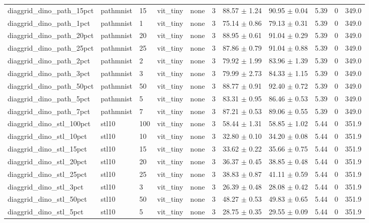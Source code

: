 \begin{tabular}{lllllllllll}
diaggrid_dino_path_15pct & pathmnist & 15 & vit_tiny & none & 3 & 88.57 $\pm$ 1.24 & 90.95 $\pm$ 0.04 & 5.39 & 0 & 349.0 \\
diaggrid_dino_path_1pct & pathmnist & 1 & vit_tiny & none & 3 & 75.14 $\pm$ 0.86 & 79.13 $\pm$ 0.31 & 5.39 & 0 & 349.0 \\
diaggrid_dino_path_20pct & pathmnist & 20 & vit_tiny & none & 3 & 88.95 $\pm$ 0.61 & 91.04 $\pm$ 0.29 & 5.39 & 0 & 349.0 \\
diaggrid_dino_path_25pct & pathmnist & 25 & vit_tiny & none & 3 & 87.86 $\pm$ 0.79 & 91.04 $\pm$ 0.88 & 5.39 & 0 & 349.0 \\
diaggrid_dino_path_2pct & pathmnist & 2 & vit_tiny & none & 3 & 79.92 $\pm$ 1.99 & 83.96 $\pm$ 1.39 & 5.39 & 0 & 349.0 \\
diaggrid_dino_path_3pct & pathmnist & 3 & vit_tiny & none & 3 & 79.99 $\pm$ 2.73 & 84.33 $\pm$ 1.15 & 5.39 & 0 & 349.0 \\
diaggrid_dino_path_50pct & pathmnist & 50 & vit_tiny & none & 3 & 88.77 $\pm$ 0.91 & 92.40 $\pm$ 0.72 & 5.39 & 0 & 349.0 \\
diaggrid_dino_path_5pct & pathmnist & 5 & vit_tiny & none & 3 & 83.31 $\pm$ 0.95 & 86.46 $\pm$ 0.53 & 5.39 & 0 & 349.0 \\
diaggrid_dino_path_7pct & pathmnist & 7 & vit_tiny & none & 3 & 87.21 $\pm$ 0.53 & 89.06 $\pm$ 0.55 & 5.39 & 0 & 349.0 \\
diaggrid_dino_stl_100pct & stl10 & 100 & vit_tiny & none & 3 & 58.44 $\pm$ 1.31 & 58.85 $\pm$ 1.02 & 5.44 & 0 & 351.9 \\
diaggrid_dino_stl_10pct & stl10 & 10 & vit_tiny & none & 3 & 32.80 $\pm$ 0.10 & 34.20 $\pm$ 0.08 & 5.44 & 0 & 351.9 \\
diaggrid_dino_stl_15pct & stl10 & 15 & vit_tiny & none & 3 & 33.62 $\pm$ 0.22 & 35.66 $\pm$ 0.75 & 5.44 & 0 & 351.9 \\
diaggrid_dino_stl_20pct & stl10 & 20 & vit_tiny & none & 3 & 36.37 $\pm$ 0.45 & 38.85 $\pm$ 0.48 & 5.44 & 0 & 351.9 \\
diaggrid_dino_stl_25pct & stl10 & 25 & vit_tiny & none & 3 & 38.83 $\pm$ 0.87 & 41.11 $\pm$ 0.59 & 5.44 & 0 & 351.9 \\
diaggrid_dino_stl_3pct & stl10 & 3 & vit_tiny & none & 3 & 26.39 $\pm$ 0.48 & 28.08 $\pm$ 0.42 & 5.44 & 0 & 351.9 \\
diaggrid_dino_stl_50pct & stl10 & 50 & vit_tiny & none & 3 & 48.27 $\pm$ 0.53 & 49.83 $\pm$ 0.65 & 5.44 & 0 & 351.9 \\
diaggrid_dino_stl_5pct & stl10 & 5 & vit_tiny & none & 3 & 28.75 $\pm$ 0.35 & 29.55 $\pm$ 0.09 & 5.44 & 0 & 351.9 \\

\end{tabular}
